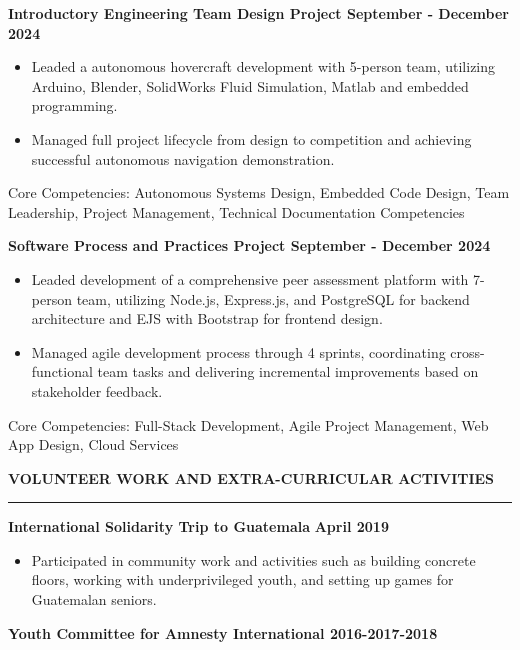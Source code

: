 \documentclass[letterpaper,11pt]{article}
\begin{document}
\textbf{Introductory Engineering Team Design Project \hfill September - December 2024}
\begin{itemize}
\setlength{\itemsep}{-3pt}
\item
Leaded a autonomous hovercraft development with 5-person team, utilizing Arduino, Blender, SolidWorks Fluid Simulation, Matlab and embedded programming.
\item
Managed full project lifecycle from design to competition and achieving successful autonomous navigation demonstration.
\end{itemize}
Core Competencies: Autonomous Systems Design, Embedded Code Design, Team Leadership, Project Management, Technical Documentation
Competencies

\textbf{Software Process and Practices Project \hfill September - December 2024}

\begin{itemize}
\setlength{\itemsep}{-3pt}
\item
Leaded development of a comprehensive peer assessment platform with 7-person team, utilizing Node.js,
Express.js, and PostgreSQL for backend architecture and EJS with Bootstrap for frontend design.
\item
Managed agile development process through 4 sprints, coordinating cross-functional team tasks
and delivering incremental improvements based on stakeholder feedback.
\end{itemize}
Core Competencies: Full-Stack Development, Agile Project Management, Web App Design, Cloud Services

\textbf{VOLUNTEER WORK AND EXTRA-CURRICULAR ACTIVITIES}\par
\vspace{-20pt}
\rule{\textwidth}{0.4pt}
\textbf{International Solidarity Trip to Guatemala} \hfill \textbf{April 2019}

\begin{itemize}
\setlength{\itemsep}{-3pt}
\item
  Participated in community work and activities such as building
  concrete floors, working with underprivileged youth, and setting up
  games for Guatemalan seniors.
\end{itemize}

\textbf{Youth Committee for Amnesty International \hfill 2016-2017-2018}
\end{document}

